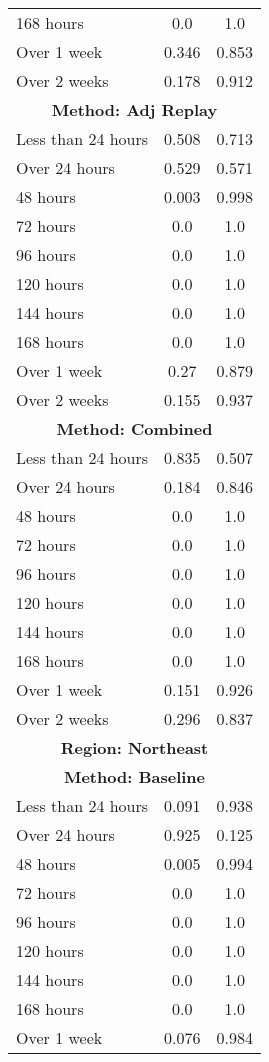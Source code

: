 \documentclass{article}
\begin{document}
\begin{longtable}{lcc}
168 hours & 0.0 & 1.0 \\
Over 1 week & 0.346 & 0.853 \\
Over 2 weeks & 0.178 & 0.912 \\
\midrule
\multicolumn{3}{c}{\textbf{Method: Adj Replay}} \\
\midrule
Less than 24 hours & 0.508 & 0.713 \\
Over 24 hours & 0.529 & 0.571 \\
48 hours & 0.003 & 0.998 \\
72 hours & 0.0 & 1.0 \\
96 hours & 0.0 & 1.0 \\
120 hours & 0.0 & 1.0 \\
144 hours & 0.0 & 1.0 \\
168 hours & 0.0 & 1.0 \\
Over 1 week & 0.27 & 0.879 \\
Over 2 weeks & 0.155 & 0.937 \\
\midrule
\multicolumn{3}{c}{\textbf{Method: Combined}} \\
\midrule
Less than 24 hours & 0.835 & 0.507 \\
Over 24 hours & 0.184 & 0.846 \\
48 hours & 0.0 & 1.0 \\
72 hours & 0.0 & 1.0 \\
96 hours & 0.0 & 1.0 \\
120 hours & 0.0 & 1.0 \\
144 hours & 0.0 & 1.0 \\
168 hours & 0.0 & 1.0 \\
Over 1 week & 0.151 & 0.926 \\
Over 2 weeks & 0.296 & 0.837 \\
\midrule
\midrule
\multicolumn{3}{c}{\textbf{Region: Northeast}} \\
\multicolumn{3}{c}{\textbf{Method: Baseline}} \\
\midrule
Less than 24 hours & 0.091 & 0.938 \\
Over 24 hours & 0.925 & 0.125 \\
48 hours & 0.005 & 0.994 \\
72 hours & 0.0 & 1.0 \\
96 hours & 0.0 & 1.0 \\
120 hours & 0.0 & 1.0 \\
144 hours & 0.0 & 1.0 \\
168 hours & 0.0 & 1.0 \\
Over 1 week & 0.076 & 0.984 \\

\end{longtable}
\end{document}
